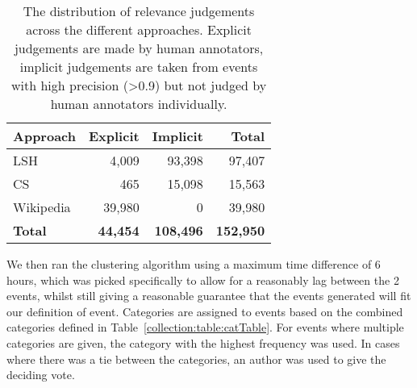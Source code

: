 \begin{table}[h!]
	\centering
	\caption[Distribution of relevance judgements across the different approaches.]{The distribution of relevance judgements across the different approaches. Explicit judgements are made by human annotators, implicit judgements are taken from events with high precision (\textgreater 0.9) but not judged by human annotators individually.}
	\label{table:eventsByTweets}

	\begin{tabulary}{\textwidth}{l r r r}
	\toprule
	\textbf{Approach} & \textbf{Explicit} & \textbf{Implicit} & \textbf{Total} \\
	\midrule
	LSH 		& 4,009 	& 93,398 	&  97,407 \\
	CS 			& 465 		& 15,098 	&  15,563 \\
	Wikipedia 	& 39,980 	& 0 		&  39,980  \\
	\midrule
	\textbf{Total} 	& \textbf{44,454} & \textbf{108,496} & \textbf{152,950}\\
	\bottomrule
	\end{tabulary}

\end{table}

We then ran the clustering algorithm using a maximum time difference of 6 hours, which was picked specifically to allow for a reasonably lag between the 2 events, whilst still giving a reasonable guarantee that the events generated will fit our definition of event.
Categories are assigned to events based on the combined categories defined in Table~\ref{collection:table:catTable}.
For events where multiple categories are given, the category with the highest frequency was used.
In cases where there was a tie between the categories, an author was used to give the deciding vote.